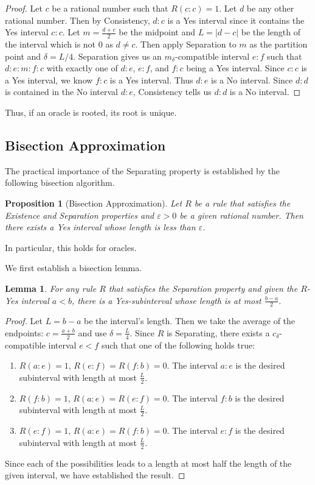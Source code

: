 \documentclass[12pt]{article}
\newtheorem{lemma}{Lemma}[subsection]
\newtheorem{proposition}{Proposition}[subsection]
\begin{document}
\begin{proof}
    Let $c$ be a rational number such that $R(c:c)=1$. Let $d$ be any other rational number. Then by Consistency, $d:c$ is a Yes interval since it contains the Yes interval $c:c$. Let $m = \frac{d+c}{2}$ be the midpoint and $L=|d-c|$ be the length of the interval which is not 0 as $d \neq c$. Then apply Separation to $m$ as the partition point and $\delta=L/4$. Separation gives us an $m_{\delta}$-compatible interval $e:f$ such that $d:e:m:f:c$ with exactly one of $d:e$, $e:f$, and $f:c$ being a Yes interval. Since $c:c$ is a Yes interval, we know $f:c$ is a Yes interval. Thus $d:e$ is a No interval. Since $d:d$ is contained in the No interval $d:e$, Consistency tells us $d:d$ is a No interval. 
\end{proof}

Thus, if an oracle is rooted, its root is unique. 

\subsection{Bisection Approximation}

The practical importance of the Separating property is established by the following bisection algorithm. 

\begin{proposition}[Bisection Approximation]\label{pr:short}
Let $R$ be a rule that satisfies the Existence and Separation properties and $\varepsilon > 0$ be a given rational number. Then there exists a Yes interval whose length is less than $\varepsilon$.
\end{proposition}

In particular, this holds for oracles. 

We first establish a bisection lemma.

\begin{lemma}
   For any rule $R$ that satisfies the Separation property and given the $R$-Yes interval $a\lt b$, there is a Yes-subinterval whose length is at most $\frac{b-a}{2}$. 
\end{lemma}

\begin{proof}
 Let $L = b-a$ be the interval's length. Then we take the average of the endpoints: $c = \frac{a+b}{2}$ and use $\delta = \frac{L}{4}$. Since $R$ is Separating, there exists a $c_{\delta}$-compatible interval $e \lt f$ such that one of the following holds true:
\begin{enumerate}
    \item $R(a:e)=1$, $R(e:f) = R(f:b) = 0$. The interval $a:e$ is the desired subinterval with length at most $\frac{L}{2}$.
    \item $R(f:b)=1$, $R(a:e) = R(e:f) = 0$. The interval $f:b$ is the desired subinterval with length at most $\frac{L}{2}$.
    \item $R(e:f)=1$, $R(a:e) = R(f:b) = 0$. The interval $e:f$ is the desired subinterval with length at most $\frac{L}{2}$.
\end{enumerate}
Since each of the possibilities leads to a length at most half the length of the given interval, we have established the result. 
    \end{proof}
\end{document}
